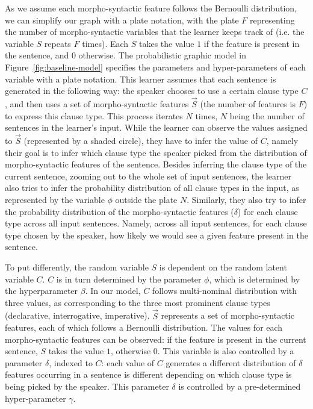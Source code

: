 As we assume each morpho-syntactic feature follows the Bernoulli distribution, we can simplify our graph with a plate notation, with the plate $F$ representing the number of morpho-syntactic variables that the learner keeps track of (i.e. the variable $S$ repeats $F$ times). Each $S$ takes the value $1$ if the feature is present in the sentence, and $0$ otherwise. The probabilistic graphic model in Figure~\ref{fig:baseline-model} specifies the parameters and hyper-parameters of each variable with a plate notation. This learner assumes that each sentence is generated in the following way: the speaker chooses to use a certain clause type $C$, and then uses a set of morpho-syntactic features $\vec{S}$ (the number of features is $F$) to express this clause type. This process iterates $N$ times, $N$ being the number of sentences in the learner’s input. While the learner can observe the values assigned to $\vec{S}$ (represented by a shaded circle), they have to infer the value of $C$, namely their goal is to infer which clause type the speaker picked from the distribution of morpho-syntactic features of the sentence. Besides inferring the clause type of the current sentence, zooming out to the whole set of input sentences, the learner also tries to infer the probability distribution of all clause types in the input, as represented by the variable $\phi$ outside the plate $N$. Similarly, they also try to infer the probability distribution of the morpho-syntactic features ($\delta$) for each clause type across all input sentences. Namely, across all input sentences, for each clause type chosen by the speaker, how likely we would see a given feature present in the sentence. 

To put differently, the random variable $S$ is dependent on the random latent variable $C$. $C$ is in turn determined by the parameter $\phi$, which is determined by the hyperparameter $\beta$. In our model, $C$ follows multi-nominal distribution with three values, as corresponding to the three most prominent clause types (declarative, interrogative, imperative). $\vec{S}$ represents a set of morpho-syntactic features, each of which follows a Bernoulli distribution. The values for each morpho-syntactic features can be observed: if the feature is present in the current sentence, $S$ takes the value $1$, otherwise $0$. This variable is also controlled by a parameter $\delta$, indexed to $C$: each value of $C$ generates a different distribution of $\delta$ features occurring in a sentence is different depending on which clause type is being picked by the speaker. This parameter $\delta$ is controlled by a pre-determined hyper-parameter $\gamma$.



